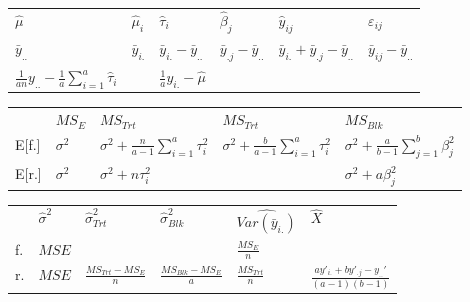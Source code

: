 \documentclass[10pt,portrait]{article}
\begin{document}
\begin{multicols}{2}
\begin{tabular}{l|l|l|l|l|l}
$\hat\mu$&$\hat\mu_i$&$\hat\tau_i$&$\hat\beta_j$&$\hat y_{ij}$&$\varepsilon_{ij}$\\
$\bar y_{..}$&$\bar y_{i.}$&$\bar y_{i.}-\bar y_{..}$&$\bar y_{.j}-\bar y_{..}$&$\bar y_{i.}+\bar y_{.j}-\bar y_{..}$&$\bar y_{ij}-\bar y_{..}$\\
$\frac1{an}y_{..}-\frac1{a}\sum_{i=1}^a\hat\tau_i$& & $\frac1{a}y_{i.}-\hat\mu$\\
\hline
\end{tabular}

\begin{tabular}{l|l|l|l|l}
     &$MS_{E}$  & $MS_{Trt}$ & $MS_{Trt}$ & $MS_{Blk}$ \\
E[f.]&$\sigma^2$& $\sigma^2+\frac{n}{a-1}\sum_{i=1}^a\tau_i^2$& $\sigma^2+\frac{b}{a-1}\sum_{i=1}^a\tau_i^2$&$\sigma^2+\frac{a}{b-1}\sum_{j=1}^b\beta_j^2$\\
E[r.]&$\sigma^2$& $\sigma^2+n\tau_i^2$& & $\sigma^2+a\beta_j^2$\\
\hline
\end{tabular}

\begin{tabular}{l|l|l|l|l|l}
&$\hat\sigma^2$&$\hat\sigma_{Trt}^2$&$\hat\sigma_{Blk}^2$&$\widehat{Var(\bar y_{i.})}$&$\hat{X}$\\
f.&$MSE$& & &$\frac{MS_{E}}{n}$&\\
r.&$MSE$&$\frac{MS_{Trt}-MS_{E}}{n}$&$\frac{MS_{Blk}-MS_{E}}{a}$&$\frac{MS_{Trt}}{n}$&$\frac{ay'_{i.}+by'_{.j}-y_{..}'}{(a-1)(b-1)}$\\
\end{tabular}



\end{multicols}
\end{document}
